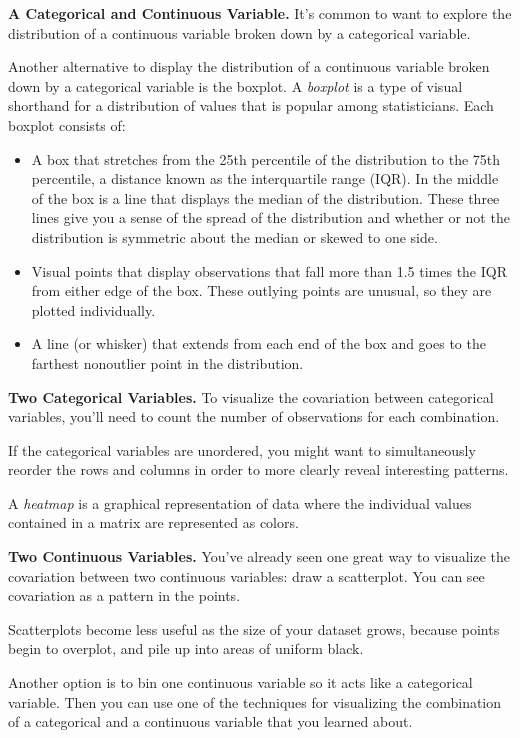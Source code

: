 \documentclass{article}
\begin{document}
\textbf{A Categorical and Continuous Variable.} It’s common to want to explore the distribution of a continuous
variable broken down by a categorical variable.

Another alternative to display the distribution of a continuous variable broken down by a categorical variable is the boxplot. A \textit{boxplot} is a type of visual shorthand for a distribution of values that is popular among statisticians. Each boxplot consists of:

\begin{itemize}
\item A box that stretches from the 25th percentile of the distribution to the 75th percentile, a distance known as the interquartile range (IQR). In the middle of the box is a line that displays the median of the distribution. These three lines give you a sense of the spread of the distribution and whether or not the distribution is symmetric about the median or skewed to one side.
\item Visual points that display observations that fall more than 1.5 times the IQR from either edge of the box. These outlying points are unusual, so they are plotted individually.
\item A line (or whisker) that extends from each end of the box and goes to the farthest nonoutlier point in the distribution.
\end{itemize}

\textbf{Two Categorical Variables.} To visualize the covariation between categorical variables, you’ll need to count the number of observations for each combination.

If the categorical variables are unordered, you might want to simultaneously reorder the rows and columns in order to more clearly reveal interesting patterns.

A \textit{heatmap} is a graphical representation of data where the individual values contained in a matrix are represented as colors.

\textbf{Two Continuous Variables.} You’ve already seen one great way to visualize the covariation between two continuous variables: draw a scatterplot. You can see covariation as a pattern in the points.

Scatterplots become less useful as the size of your dataset grows, because points begin to overplot, and pile up into areas of uniform black.

Another option is to bin one continuous variable so it acts like a categorical variable. Then you can use one of the techniques for visualizing the combination of a categorical and a continuous variable that you learned about.
\end{document}
